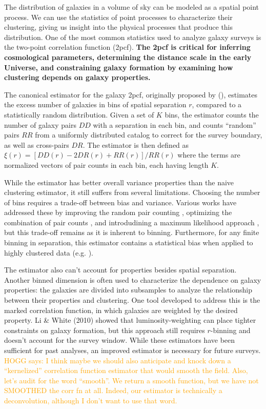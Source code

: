 \documentclass[12pt, fullpage, letterpaper]{article}
\newcommand{\HOGG}[1]{\textcolor{orange}{HOGG says: #1}}
\newcommand{\cf}{2pcf\xspace}
\newcommand{\LS}{\acronym{LS}\xspace}
\begin{document}
The distribution of galaxies in a volume of sky can be modeled as a spatial point process.
We can use the statistics of point processes to characterize their clustering, giving us insight into the physical processes that produce this distribution.
One of the most common statistics used to analyze galaxy surveys is the two-point correlation function (\cf). 
\textbf{The \cf is critical for inferring cosmological parameters, determining the distance scale in the early Universe, and constraining galaxy formation by examining how clustering depends on galaxy properties.}
 
The canonical estimator for the galaxy \cf, originally proposed by \cite{LandySzalay1993} (\LS), estimates the excess number of galaxies in bins of spatial separation $r$, compared to a statistically random distribution.
Given a set of $K$ bins, the \LS estimator counts the number of galaxy pairs $DD$ with a separation in each bin, and counts ``random'' pairs $RR$ from a uniformly distributed catalog  to correct for the survey boundary, as well as cross-pairs $DR$.
The estimator is then defined as $\xi(r) = [DD(r) - 2DR(r) + RR(r)]/RR(r)$
where the terms are normalized vectors of pair counts in each bin, each having length $K$.

While the \LS estimator has better overall variance properties than the naive clustering estimator, it still suffers from several limitations. 
Choosing the number of bins requires a trade-off between bias and variance.
Various works have addressed these by improving the random pair counting \citep{Demina2016}, optimizing the combination of pair counts \citep{VargasMagana2013}, and introdudining a maximum likelihood approach \citep{BaxterRozo2013}, but this trade-off remains as it is inherent to binning.
Furthermore, for any finite binning in separation, this estimator contains a statistical bias when applied to highly clustered data (e.g. \citealt{Kerscher1998}).

The \LS estimator also can't account for properties besides spatial separation.
Another binned dimension is often used to characterize the dependence
on galaxy properties: the galaxies are divided into subsamples to
analyze the relationship between their properties and clustering.
One tool developed to address this is the marked correlation function, in which galaxies are weighted by the desired property.
Li \& White (2010) showed that luminosity-weighting can place tighter constraints on galaxy formation, but this approach still requires $r$-binning and doesn't account for the survey window.
While these estimators have been sufficient for past analyses, an improved estimator is necessary for future surveys.
\HOGG{I think maybe we should also anticipate and knock down a
  ``kernelized'' correlation function estimator that would smooth the
  field. Also, let's audit for the word ``smooth''. We return a smooth
  function, but we have not SMOOTHED the corr fn at all. Indeed, our
  estimator is technically a deconvolution, although I don't want to
  use that word.}
\end{document}
